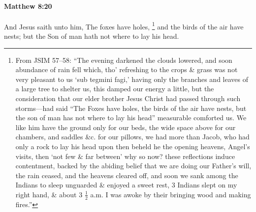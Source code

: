 		\paragraph{Matthew 8:20} %
			\label{MATTHEW-8-20}

			And Jesus saith unto him, The foxes have holes,%
				\footnote{%
					\label{MATTHEW-8-20-foxes}%
					From JSIM 57--58: ``The evening darkened the clouds lowered, and soon abundance of rain fell which, tho' refreshing to the crops \& grass was not very pleasant to us `sub tegmini fagi,' having only the branches and leaves of a large tree to shelter us, this damped our energy a little, but the consideration that our elder brother Jesus Christ had passed through such storms---had said ``The Foxes have holes, the birds of the air have nests, but the son of man has not where to lay his head'' measurable comforted us. We like him have the ground only for our beds, the wide space above for our chambers, and saddles \&c. for our pillows, we had more than Jacob, who had only a rock to lay his head upon then beheld he the opening heavens, Angel's visits, then `not few \& far between' why so now? these reflections induce contentment, backed by the abiding belief that we are doing our Father's will, the rain ceased, and the heavens cleared off, and soon we sank among the Indians to sleep unguarded \& enjoyed a sweet rest, 3 Indians slept on my right hand, \& about 3 $\frac{1}{2}$ a.m. I was awoke by their bringing wood and making fires.''
					}
			and the birds of the air have nests; but the Son of man hath not where to lay his head.

			\begin{framed}
			\scriptsize
				\begin{compactdesc}
					\item[SBLG] 
				\end{compactdesc}
			\end{framed}

